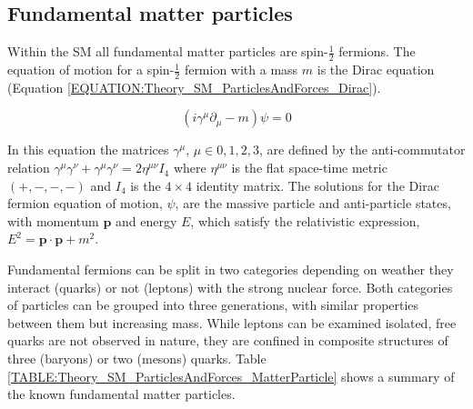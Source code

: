 \subsection{Fundamental matter particles}
\label{SUBSECTION:Theory_SM_ParticlesAndForces}


Within the \gls{SM} all fundamental matter particles are spin-$\frac{1}{2}$ fermions. The equation of motion for a spin-$\frac{1}{2}$ fermion with a mass $m$ is the Dirac equation (Equation \ref{EQUATION:Theory_SM_ParticlesAndForces_Dirac}).

\begin{equation}
(i\gamma^{\mu}\partial_{\mu} - m)\psi = 0
\label{EQUATION:Theory_SM_ParticlesAndForces_Dirac}
\end{equation}

In this equation the matrices $\gamma^{\mu}$, $\mu\in{0,1,2,3}$, are defined by the anti-commutator relation $\gamma^{\mu}\gamma^{\nu}+\gamma^{\mu}\gamma^{\nu} = 2\eta^{\mu\nu}I_{4}$ where $\eta^{\mu\nu}$ is the flat space-time metric $(+,-,-,-)$ and $I_{4}$ is the $4\times4$ identity matrix. The solutions for the Dirac fermion equation of motion, $\psi$, are the massive particle and anti-particle states, with momentum $\mathbf{p}$ and energy $E$, which satisfy the relativistic expression, $E^{2} = \mathbf{p}\cdot\mathbf{p} + m^{2}$.

Fundamental fermions can be split in two categories depending on weather they interact (quarks) or not (leptons) with the strong nuclear force. Both categories of particles can be grouped into three generations, with similar properties between them but increasing mass. While leptons can be examined isolated, free quarks are not observed in nature, they are confined in composite structures of three (baryons) or two (mesons) quarks. Table \ref {TABLE:Theory_SM_ParticlesAndForces_MatterParticle} shows a summary of the known fundamental matter particles.

